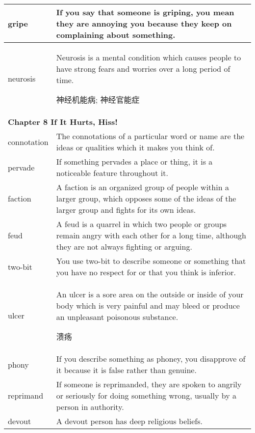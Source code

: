\documentclass{article}
\begin{document}
\begin{center}
\begin{longtable}{|l|p{9cm}|}
\hline
gripe
&
If you say that someone is griping, you mean they are annoying you because they keep on complaining about something.
\\

\hline
neurosis
&
Neurosis is a mental condition which causes people to have strong fears and worries over a long period of time.
\par
神经机能病; 神经官能症
\\

\hline
\multicolumn{2}{|l|}{\textbf{Chapter 8 If It Hurts, Hiss!}}\\

\hline
connotation
&
The connotations of a particular word or name are the ideas or qualities which it makes you think of.
\\

\hline
pervade
&
If something pervades a place or thing, it is a noticeable feature throughout it.
\\

\hline
faction
&
A faction is an organized group of people within a larger group, which opposes some of the ideas of the larger group and fights for its own ideas.
\\

\hline
feud
&
A feud is a quarrel in which two people or groups remain angry with each other for a long time, although they are not always fighting or arguing.
\\

\hline
two-bit
&
You use two-bit to describe someone or something that you have no respect for or that you think is inferior.
\\

\hline
ulcer
&
An ulcer is a sore area on the outside or inside of your body which is very painful and may bleed or produce an unpleasant poisonous substance.
\par
溃疡
\\

\hline
phony
&
If you describe something as phoney, you disapprove of it because it is false rather than genuine.
\\

\hline
reprimand
&
If someone is reprimanded, they are spoken to angrily or seriously for doing something wrong, usually by a person in authority.
\\

\hline
devout
&
A devout person has deep religious beliefs.
\\


\end{longtable}
\end{center}
\end{document}
